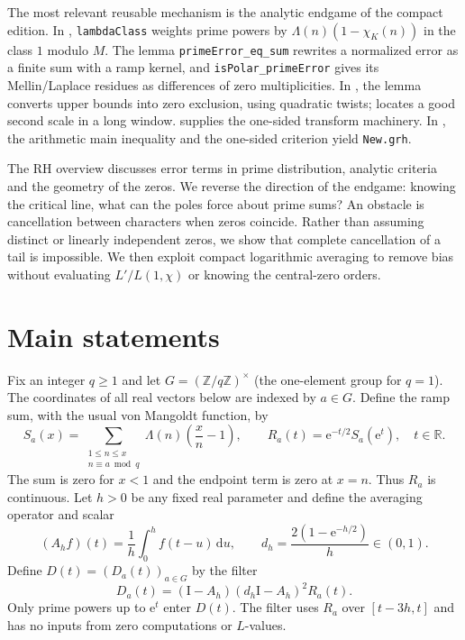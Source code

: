 \documentclass[11pt]{article}
\newcommand{\R}{\mathbb R}\newcommand{\C}{\mathbb C}\newcommand{\Z}{\mathbb Z}\newcommand{\e}{\mathrm e}\newcommand{\dd}{\,\mathrm d}\newcommand{\id}{\mathrm I}\newcommand{\ord}{\operatorname{ord}}\newcommand{\Rea}{\operatorname{Re}}\newcommand{\conv}{\operatorname{conv}}\newcommand{\norm}[1]{\lVert#1\rVert}\newcommand{\ph}{\varphi(q)}
\begin{document}
The most relevant reusable mechanism is the analytic endgame of the compact edition. In , \texttt{lambdaClass} weights prime powers by $\Lambda(n)(1-\chi_K(n))$ in the class $1$ modulo $M$. The lemma \texttt{primeError\_eq\_sum} rewrites a normalized error as a finite sum with a ramp kernel, and \texttt{isPolar\_primeError} gives its Mellin/Laplace residues as differences of zero multiplicities. In , the lemma  converts upper bounds into zero exclusion, using quadratic twists;  locates a good second scale in a long window.  supplies the one-sided transform machinery. In , the arithmetic main inequality and the one-sided criterion yield \texttt{New.grh}.

The RH overview \cite{wiki} discusses error terms in prime distribution, analytic criteria and the geometry of the zeros. We reverse the direction of the endgame: knowing the critical line, what can the poles force about prime sums? An obstacle is cancellation between characters when zeros coincide. Rather than assuming distinct or linearly independent zeros, we show that complete cancellation of a tail is impossible. We then exploit compact logarithmic averaging to remove bias without evaluating $L'/L(1,\chi)$ or knowing the central-zero orders.

\section{Main statements}
Fix an integer $q\ge 1$ and let $G=(\Z/q\Z)^\times$ (the one-element group for $q=1$). The coordinates of all real vectors below are indexed by $a\in G$. Define the ramp sum, with the usual von Mangoldt function, by
\begin{equation}\label{eq:ramp}
 S_a(x)=\sum_{\substack{1\le n\le x\\n\equiv a\bmod q}}\Lambda(n)\left(\frac{x}{n}-1\right),\qquad
 R_a(t)=\e^{-t/2}S_a(\e^t),\quad t\in\R.
\end{equation}
The sum is zero for $x<1$ and the endpoint term is zero at $x=n$. Thus $R_a$ is continuous. Let $h>0$ be any fixed real parameter and define the averaging operator and scalar
\begin{equation}\label{eq:average}
 (A_h f)(t)=\frac1h\int_0^h f(t-u)\dd u,\qquad
 d_h=\frac{2(1-\e^{-h/2})}{h}\in(0,1).
\end{equation}
Define $D(t)=(D_a(t))_{a\in G}$ by the filter
\begin{equation}\label{eq:filter}
 \boxed{D_a(t)=(\id-A_h)(d_h\id-A_h)^2 R_a(t).}
\end{equation}
Only prime powers up to $\e^t$ enter $D(t)$. The filter uses $R_a$ over $[t-3h,t]$ and has no inputs from zero computations or $L$-values.
\end{document}
